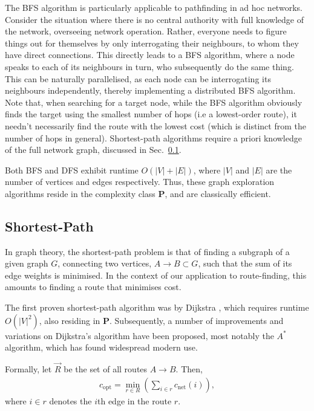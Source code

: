 \documentclass[aps,rmp,twocolumn,amsmath,amssymb,nofootinbib,superscriptaddress]{revtex4}
\begin{document}
The BFS algorithm is particularly applicable to pathfinding in ad hoc networks. Consider the situation where there is no central authority with full knowledge of the network, overseeing network operation. Rather, everyone needs to figure things out for themselves by only interrogating their neighbours, to whom they have direct connections. This directly leads to a BFS algorithm, where a node speaks to each of its neighbours in turn, who subsequently do the same thing. This can be naturally parallelised, as each node can be interrogating its neighbours independently, thereby implementing a distributed BFS algorithm. Note that, when searching for a target node, while the BFS algorithm obviously finds the target using the smallest number of hops (i.e a lowest-order route), it needn't necessarily find the route with the lowest cost (which is distinct from the number of hops in general). Shortest-path algorithms require a priori knowledge of the full network graph, discussed in Sec.~\ref{sec:shortest_path}.

Both BFS and DFS exhibit runtime \mbox{$O(|V|+|E|)$}, where $|V|$ and $|E|$ are the number of vertices and edges respectively. Thus, these graph exploration algorithms reside in the complexity class \textbf{P}, and are classically efficient.

%
%

\subsection{Shortest-Path} \label{sec:shortest_path}

In graph theory, the shortest-path problem is that of finding a subgraph of a given graph $G$, connecting two vertices, \mbox{$A\to B \subset G$}, such that the sum of its edge weights is minimised. In the context of our application to route-finding, this amounts to finding a route that minimises cost.

The first proven shortest-path algorithm was by Dijkstra \cite{bib:Dijkstra59}, which requires runtime $O(|V|^2)$, also residing in \textbf{P}. Subsequently, a number of improvements and variations on Dijkstra's algorithm have been proposed, most notably the $A^*$ algorithm, which has found widespread modern use.

Formally, let $\vec{R}$ be the set of all routes \mbox{$A\to B$}. Then,
\begin{align}
c_\mathrm{opt} = \min_{r\in R} \left(\sum_{i\in r} c_\mathrm{net}(i) \right),
\end{align}
where \mbox{$i\in r$} denotes the $i$th edge in the route $r$.
\end{document}

